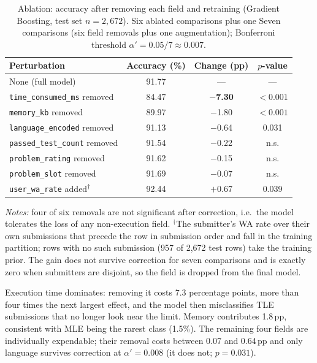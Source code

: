 \documentclass[acmsmall]{acmart}
\begin{document}
\begin{table}[htbp]
\centering
\caption{Ablation: accuracy after removing each field and retraining
 (Gradient Boosting, test set $n=2{,}672$). Six ablated comparisons plus one
 Seven comparisons (six field removals plus one augmentation); Bonferroni threshold $\alpha'=0.05/7\approx0.007$.}
\label{tab:ablation}
\begin{tabular}{@{}lccc@{}}
\toprule
Perturbation & Accuracy (\%) & Change (pp) & $p$-value \\
\midrule
None (full model) & 91.77 & --- & --- \\
\texttt{time\_consumed\_ms} removed & 84.47 & \textbf{$-$7.30} & $<0.001$ \\
\texttt{memory\_kb} removed & 89.97 & $-$1.80 & $<0.001$ \\
\texttt{language\_encoded} removed & 91.13 & $-$0.64 & 0.031 \\
\texttt{passed\_test\_count} removed & 91.54 & $-$0.22 & n.s. \\
\texttt{problem\_rating} removed & 91.62 & $-$0.15 & n.s. \\
\texttt{problem\_slot} removed & 91.69 & $-$0.07 & n.s. \\
\midrule
\texttt{user\_wa\_rate} added$^{\dagger}$ & 92.44 & $+$0.67 & 0.039 \\
\bottomrule
\end{tabular}

\vspace{2mm}
{\small\textit{Notes:} four of six removals are not significant after
correction, i.e.\ the model tolerates the loss of any non-execution field.
$^{\dagger}$The submitter's WA rate over their own submissions that precede
the row in submission order and fall in the training partition; rows with no
such submission (957 of 2,672 test rows) take the training prior. The gain
does not survive correction for seven comparisons and is exactly zero when
submitters are disjoint, so the field is dropped from the final model.}
\end{table}

Execution time dominates: removing it costs 7.3 percentage points, more than
four times the next largest effect, and the model then misclassifies TLE
submissions that no longer look near the limit. Memory contributes 1.8\,pp,
consistent with MLE being the rarest class (1.5\%). The remaining four fields
are individually expendable; their removal costs between 0.07 and 0.64\,pp and
only language survives correction at $\alpha'=0.008$ (it does not; $p=0.031$).
\end{document}
